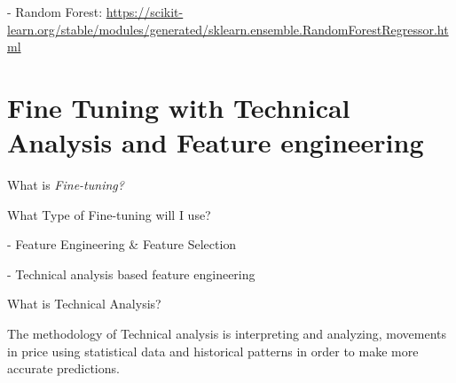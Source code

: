 \documentclass[12pt]{report} %
\begin{document}





- Random Forest: \url{https://scikit-learn.org/stable/modules/generated/sklearn.ensemble.RandomForestRegressor.html}




\section{Fine Tuning with Technical Analysis and Feature engineering}
What is \textit{Fine-tuning?} \cite{ibm_finetuning}

What Type of Fine-tuning will I use?

- Feature Engineering \& Feature Selection

- Technical analysis based feature engineering

    What is Technical Analysis?
    
        The methodology of Technical analysis is interpreting and analyzing, movements in price using statistical data and historical patterns in order to make more accurate predictions. \cite{britannica_ta}
        
\end{document}

